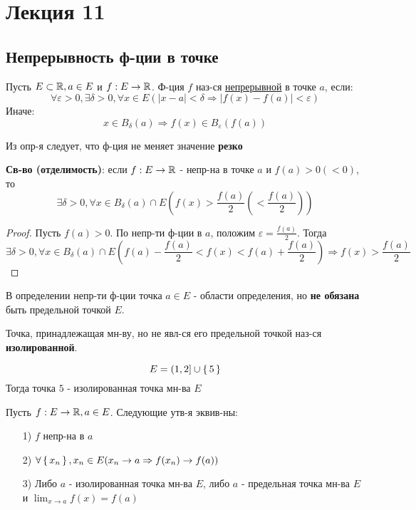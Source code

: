 \section{Лекция 11}
\subsection{Непрерывность ф-ции в точке}
\begin{definition}
Пусть $E \subset \mathbb{R}, a \in E$ и $f: E \rightarrow \mathbb{R}$. Ф-ция $f$ наз-ся \underline{непрерывной} в точке $a$, если:
\[
\forall \varepsilon > 0, \exists \delta > 0, \forall x \in E (\left|x - a\right| < \delta \Rightarrow \left|f(x) - f(a)\right| < \varepsilon)
\]
Иначе:
\[
x \in B_{\delta}(a) \Rightarrow f(x) \in B_{\varepsilon}(f(a))
\]
\end{definition}
\begin{note}
Из опр-я следует, что ф-ция не меняет значение \textbf{резко}
\end{note}
\textbf{Св-во (отделимость)}: если $f: E \rightarrow \mathbb{R}$ - непр-на в точке $a$ и $f(a) > 0 (< 0)$, то
\[
  \exists \delta > 0, \forall x \in B_{\delta}(a) \cap E (f(x) > \frac{f(a)}{2} (< \frac{f(a)}{2}))
\]
\begin{proof}
Пусть $f(a) > 0$. По непр-ти ф-ции в $a$, положим $\varepsilon = \frac{f(a)}{2}$. Тогда
\[
  \exists \delta > 0, \forall x \in B_{\delta}(a) \cap E (f(a) - \frac{f(a)}{2} < f(x) < f(a) + \frac{f(a)}{2}) \Rightarrow f(x) > \frac{f(a)}{2}
\]
\end{proof}
\begin{note}
В определении непр-ти ф-ции точка $a \in E \text{ - области определения}$, но \textbf{не обязана} быть предельной точкой $E$.
\end{note}
\begin{definition}
Точка, принадлежащая мн-ву, но не явл-ся его предельной точкой наз-ся \textbf{изолированной}.
\end{definition}
\begin{example}
\[
  E = (1, 2] \cup \set{5}
\]
Тогда точка $5$ - изолированная точка мн-ва $E$
\end{example}
\begin{theorem}
\label{th:num4}
Пусть $f: E \rightarrow \mathbb{R}, a \in E$. Следующие утв-я эквив-ны:
\begin{itemize}
  \item [1) ] $f$ непр-на в $a$
  \item [2) ] $\forall \set{x_n}, x_n \in E (x_n \rightarrow a \Rightarrow f(x_n) \rightarrow f(a))$
  \item [3) ] Либо $a$ - изолированная точка мн-ва $E$, либо $a$ - предельная точка мн-ва $E$ и $\lim_{x\to a} f(x) = f(a)$
\end{itemize}
\end{theorem}
